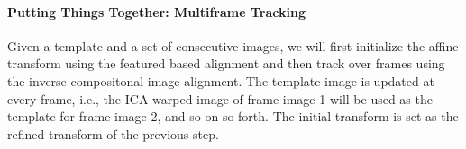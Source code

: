 \documentclass[11pt]{scrartcl}
\begin{document}
\begin{figure}[H]
	\captionsetup[subfigure]{labelformat=empty}
	\centering
\end{figure}



\paragraph{\textbf{Putting Things Together: Multiframe Tracking}}
Given a template and a set of consecutive images, we will first initialize the affine transform using the featured based alignment and then track over frames using the inverse compositonal image alignment. The template image is updated at every frame, i.e., the ICA-warped image of frame image 1 will be used as the template for frame image 2, and so on so forth. The initial transform is set as the refined transform of the previous step.
\end{document}
